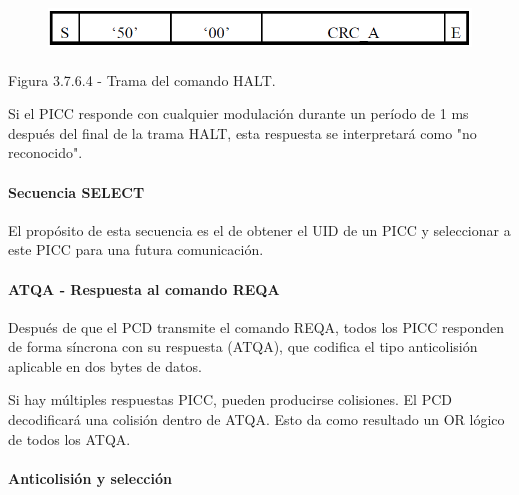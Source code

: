 
\begin{figure}[H]
	\begin{center}
		\includegraphics[width=5.47in,height=0.51in]{Norma_ISO/14443-3/media/image10.png}
        \end{center}
\end{figure}



\par
\begin{center}
Figura 3.7.6.4 - Trama del comando HALT.
\end{center}
\par

Si el PICC responde con cualquier modulación durante un período de 1 ms después del final de la trama HALT, esta respuesta se interpretará como "no reconocido".\par

\paragraph{Secuencia SELECT}
El propósito de esta secuencia es el de obtener el UID de un PICC y seleccionar a este PICC para una futura comunicación.\par

\paragraph{ATQA - Respuesta al comando REQA}
Después de que el PCD transmite el comando REQA, todos los PICC responden de forma síncrona con su respuesta (ATQA), que codifica el tipo anticolisión aplicable en dos bytes de datos.\par

Si hay múltiples respuestas PICC, pueden producirse colisiones. El PCD decodificará una colisión dentro de ATQA. Esto da como resultado un OR lógico de todos los ATQA.\par

\paragraph{Anticolisión y selección}
